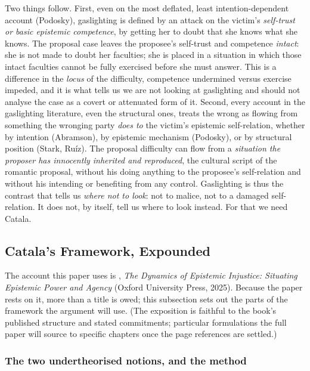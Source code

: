 Two things follow. First, even on the most deflated, least intention-dependent account (Podosky), gaslighting is defined by an attack on the victim's \emph{self-trust or basic epistemic competence}, by getting her to doubt that she knows what she knows. The proposal case leaves the proposee's self-trust and competence \emph{intact}: she is not made to doubt her faculties; she is placed in a situation in which those intact faculties cannot be fully exercised before she must answer. This is a difference in the \emph{locus} of the difficulty, competence undermined versus exercise impeded, and it is what tells us we are not looking at gaslighting and should not analyse the case as a covert or attenuated form of it. Second, every account in the gaslighting literature, even the structural ones, treats the wrong as flowing from something the wronging party \emph{does to} the victim's epistemic self-relation, whether by intention (Abramson), by epistemic mechanism (Podosky), or by structural position (Stark, Ruíz). The proposal difficulty can flow from a \emph{situation the proposer has innocently inherited and reproduced}, the cultural script of the romantic proposal, without his doing anything to the proposee's self-relation and without his intending or benefiting from any control. Gaslighting is thus the contrast that tells us \emph{where not to look}: not to malice, not to a damaged self-relation. It does not, by itself, tell us where to look instead. For that we need Catala.

\subsection{Catala's Framework, Expounded}\label{p06:sec:catala}

The account this paper uses is \textcite{catala2025dynamics}, \emph{The Dynamics of Epistemic Injustice: Situating Epistemic Power and Agency} (Oxford University Press, 2025). Because the paper rests on it, more than a title is owed; this subsection sets out the parts of the framework the argument will use. (The exposition is faithful to the book's published structure and stated commitments; particular formulations the full paper will source to specific chapters once the page references are settled.)

\subsubsection{The two undertheorised notions, and the method}

